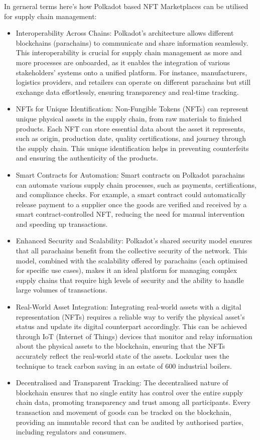 \documentclass{tufte-handout}
\begin{document}
In gerneral terms here's how Polkadot based NFT Marketplaces can be utilised for supply chain management:
\begin{itemize}
    \item Interoperability Across Chains: 
    Polkadot's architecture allows different blockchains (parachains) to communicate and share information seamlessly. This interoperability
    is crucial for supply chain management as more and more processes are onboarded, as it enables the integration of various stakeholders'
    systems onto a unified platform. For instance, manufacturers, logistics providers, and retailers can operate on different parachains but
    still exchange data effortlessly, ensuring transparency and real-time tracking.
    \item  NFTs for Unique Identification: 
    Non-Fungible Tokens (NFTs) can represent unique physical assets in the supply chain, from raw materials to finished products. Each NFT
    can store essential data about the asset it represents, such as origin, production date, quality certifications, and journey through the
    supply chain. This unique identification helps in preventing counterfeits and ensuring the authenticity of the products.
    \item Smart Contracts for Automation: 
    Smart contracts on Polkadot parachains can automate various supply chain processes, such as payments, certifications, and compliance checks.
    For example, a smart contract could automatically release payment to a supplier once the goods are verified and received by a smart
    contract-controlled NFT, reducing the need for manual intervention and speeding up transactions.
    \item Enhanced Security and Scalability: 
    Polkadot's shared security model ensures that all parachains benefit from the collective security of the network. This model, combined with
    the scalability offered by parachains (each optimised for specific use cases), makes it an ideal platform for managing complex supply chains
    that require high levels of security and the ability to handle large volumes of transactions.
    \item Real-World Asset Integration: 
    Integrating real-world assets with a digital representation (NFTs) requires a reliable way to verify the physical asset's status and update
    its digital counterpart accordingly. This can be achieved through IoT (Internet of Things) devices that monitor and relay information
    about the physical assets to the blockchain, ensuring that the NFTs accurately reflect the real-world state of the assets. Lockular uses the
    technique to track carbon saving in an estate of 600 industrial boilers.
    \item Decentralised and Transparent Tracking: The decentralised nature of blockchain ensures that no single entity has control over the
    entire supply chain data, promoting transparency and trust among all participants. Every transaction and movement of goods can be tracked
    on the blockchain, providing an immutable record that can be audited by authorised parties, including regulators and consumers.
\end{itemize}
\end{document}
